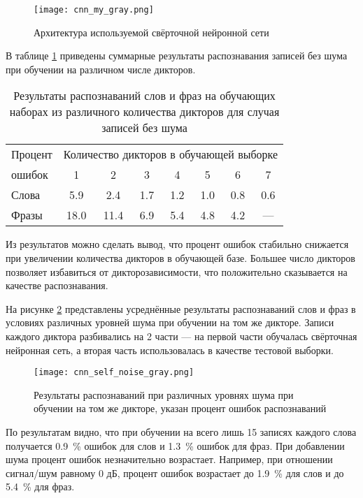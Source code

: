 \begin{figure}[h]
	\centering
	\texttt{[image: cnn\_my\_gray.png]}
	\caption{Архитектура используемой свёрточной нейронной сети}
	\label{fig:4_1}
\end{figure}

В таблице \ref{tab:4_1} приведены суммарные результаты распознавания записей без шума при обучении на различном числе дикторов.
\begin{table}[h]
	\centering
	\caption{Результаты распознаваний слов и фраз на обучающих наборах из различного количества дикторов для случая записей без шума}
	\label{tab:4_1}
	\begin{tabular}{| l | c | c | c | c | c | c | c |}
		\hline
		Процент\phantom{0} & \multicolumn{7}{c|}{Количество дикторов в обучающей выборке} \\
		\hhline{~-------}
		ошибок & \phantom{00}1 \phantom{00} & \phantom{00}2 \phantom{00} & \phantom{00}3 \phantom{00} & \phantom{00}4 \phantom{00} & \phantom{00}5 \phantom{00} & \phantom{00}6 \phantom{00} & \phantom{00}7 \phantom{00} \\
		\hline
		Слова		& 5.9 & 2.4 & 1.7 & 1.2 & 1.0 & 0.8 & 0.6 \\
		\hline
		Фразы 		& 18.0 & 11.4 & 6.9 & 5.4 & 4.8 & 4.2 & --- \\
		\hline
	\end{tabular}
\end{table}

Из результатов можно сделать вывод, что процент ошибок стабильно снижается при увеличении количества дикторов в обучающей базе.
Большее число дикторов позволяет избавиться от дикторозависимости, что положительно сказывается на качестве распознавания.

На рисунке \ref{fig:cnn_self_noise} представлены усреднённые результаты распознаваний слов и фраз в условиях различных уровней шума при обучении на том же дикторе.
Записи каждого диктора разбивались на 2 части --- на первой части обучалась свёрточная нейронная сеть, а вторая часть использовалась в качестве тестовой выборки.
\begin{figure}[h]
	\centering
	\texttt{[image: cnn\_self\_noise\_gray.png]}
	\caption{Результаты распознаваний при различных уровнях шума при обучении на том же дикторе, указан процент ошибок распознаваний}
	\label{fig:cnn_self_noise}
\end{figure}

По результатам видно, что при обучении на всего лишь 15 записях каждого слова получается 0.9~\% ошибок для слов и 1.3~\% ошибок для фраз.
При добавлении шума процент ошибок незначительно возрастает.
Например, при отношении сигнал/шум равному 0 дБ, процент ошибок возрастает до 1.9~\% для слов и до 5.4~\% для фраз.

